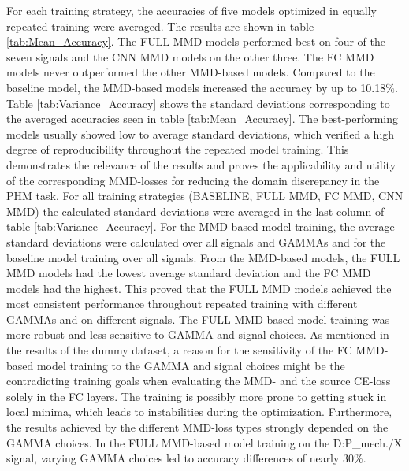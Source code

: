 For each training strategy, the accuracies of five models optimized in equally repeated training were averaged. The results are shown in table \ref{tab:Mean_Accuracy}. The FULL MMD models performed best on four of the seven signals and the CNN MMD models on the other three. The FC MMD models never outperformed the other MMD-based models. Compared to the baseline model, the MMD-based models increased the accuracy by up to 10.18$\%$. Table \ref{tab:Variance_Accuracy} shows the standard deviations corresponding to the averaged accuracies seen in table \ref{tab:Mean_Accuracy}. The best-performing models usually showed low to average standard deviations, which verified a high degree of reproducibility throughout the repeated model training. This demonstrates the relevance of the results and proves the applicability and utility of the corresponding MMD-losses for reducing the domain discrepancy in the PHM task. For all training strategies (BASELINE, FULL MMD, FC MMD, CNN MMD) the calculated standard deviations were averaged in the last column of table \ref{tab:Variance_Accuracy}. For the MMD-based model training, the average standard deviations were calculated over all signals and GAMMAs and for the baseline model training over all signals. From the MMD-based models, the FULL MMD models had the lowest average standard deviation and the FC MMD models had the highest. This proved that the FULL MMD models achieved the most consistent performance throughout repeated training with different GAMMAs and on different signals. The FULL MMD-based model training was more robust and less sensitive to GAMMA and signal choices. As mentioned in the results of the dummy dataset, a reason for the sensitivity of the FC MMD-based model training to the GAMMA and signal choices might be the contradicting training goals when evaluating the MMD- and the source CE-loss solely in the FC layers. The training is possibly more prone to getting stuck in local minima, which leads to instabilities during the optimization. Furthermore, the results achieved by the different MMD-loss types strongly depended on the GAMMA choices. In the FULL MMD-based model training on the D:P\_mech./X signal, varying GAMMA choices led to accuracy differences of nearly 30\%.
